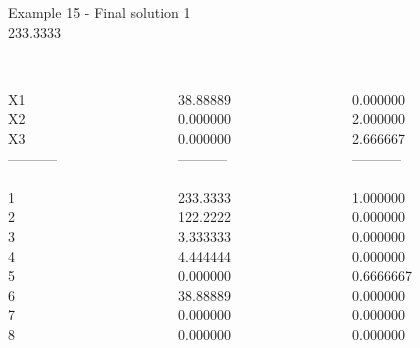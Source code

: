 \begin{frame}{Example 15 - Final solution}
\footnotesize
{} 1 \\
  233.3333\\

\begin{columns}[t]
\begin{column}{0.3\textwidth}
\\
X1\\
X2\\
X3\\
-----------\\
\\
1\\
2\\
3\\
4\\
5\\
6\\
7\\
8\\

\end{column}
\begin{column}{0.3\textwidth}
\\
38.88889\\
0.000000\\
0.000000\\

-----------\\
\\
233.3333\\
122.2222\\
3.333333\\
4.444444\\
0.000000\\
38.88889\\
0.000000\\
0.000000\\

\end{column}  

\begin{column}{0.3\textwidth}
\\
0.000000\\
2.000000\\
2.666667\\

-----------\\
\\
1.000000\\
0.000000\\
0.000000\\
0.000000\\
0.6666667\\
0.000000\\
0.000000\\
0.000000\\
\end{column}
\end{columns}  
\end{frame}
